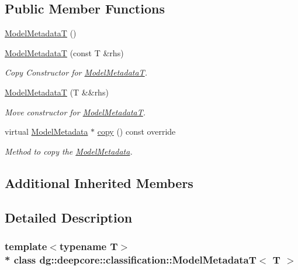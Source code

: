 \subsection*{Public Member Functions}
\begin{DoxyCompactItemize}
\item 
\hyperlink{classdg_1_1deepcore_1_1classification_1_1_model_metadata_t_a4086302e7b564f3e5a2b7ed526375c6e}{Model\+MetadataT} ()
\item 
\hyperlink{group___classification_module_ga52e88b4c63c2a8db9b06ce5b470be1c4}{Model\+MetadataT} (const T \&rhs)
\begin{DoxyCompactList}\small\item\em Copy Constructor for \hyperlink{classdg_1_1deepcore_1_1classification_1_1_model_metadata_t}{Model\+MetadataT}. \end{DoxyCompactList}\item 
\hyperlink{group___classification_module_ga76d79f72f6223539cf9d8b9549cc8a2d}{Model\+MetadataT} (T \&\&rhs)
\begin{DoxyCompactList}\small\item\em Move constructor for \hyperlink{classdg_1_1deepcore_1_1classification_1_1_model_metadata_t}{Model\+MetadataT}. \end{DoxyCompactList}\item 
virtual \hyperlink{classdg_1_1deepcore_1_1classification_1_1_model_metadata}{Model\+Metadata} $\ast$ \hyperlink{group___classification_module_ga4f92b6936e50c4e47ca4ceaaac0466f5}{copy} () const override
\begin{DoxyCompactList}\small\item\em Method to copy the \hyperlink{classdg_1_1deepcore_1_1classification_1_1_model_metadata}{Model\+Metadata}. \end{DoxyCompactList}\end{DoxyCompactItemize}
\subsection*{Additional Inherited Members}


\subsection{Detailed Description}
\subsubsection*{template$<$typename T$>$\\*
class dg\+::deepcore\+::classification\+::\+Model\+Metadata\+T$<$ T $>$}

